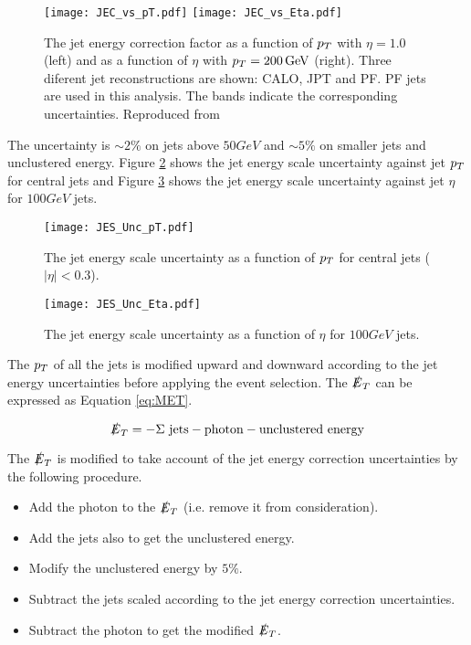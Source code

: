 \begin{figure}
\texttt{[image: JEC\_vs\_pT.pdf]}
\texttt{[image: JEC\_vs\_Eta.pdf]}
\caption{The jet energy correction factor as a function of $p_{T}$ with $\eta =
1.0$ (left) and as a function of $\eta$ with $p_{T} = 200 \, \mathrm{GeV}$ (right). 
Three diferent jet reconstructions are shown: CALO, JPT and PF. PF jets are used 
in this analysis. The bands indicate the corresponding uncertainties. Reproduced
from \cite{jec}}
\label{fig:JEC_vs_pT_And_Eta}
\end{figure}

The uncertainty is $\sim 2 \unit{\%}$ on jets above $50 \unit{GeV}$ and $\sim 5 
\unit{\%}$ on smaller jets and unclustered energy. Figure \ref{fig:JES_Unc_pT} 
shows the jet energy scale uncertainty against jet $p_{T}$ for central jets and 
Figure \ref{fig:JES_Unc_Eta} shows the jet energy scale uncertainty against jet
$\eta$ for $100\unit{GeV}$ jets. \\

\begin{figure}
\begin{center}
\texttt{[image: JES\_Unc\_pT.pdf]}
\end{center}
\caption{The jet energy scale uncertainty as a function of $p_{T}$ for
central jets ($|\eta| < 0.3$).}
\label{fig:JES_Unc_pT}
\end{figure}

\begin{figure}
\begin{center}
\texttt{[image: JES\_Unc\_Eta.pdf]}
\end{center}
\caption{The jet energy scale uncertainty as a function of $\eta$ for
$100\unit{GeV}$ jets.}
\label{fig:JES_Unc_Eta}
\end{figure}

The $p_{T}$ of all the jets is modified upward and downward according to the jet 
energy uncertainties before applying the event selection. The $\slashed{E}_{T}$ can be 
expressed as Equation \ref{eq:MET}.

\begin{equation}
\slashed{E}_{T} = -\Sigma \mbox{ jets} - \mbox{photon} - \mbox{unclustered energy}
\label{eq:MET}
\end{equation}

The $\slashed{E}_{T}$ is modified to take account of the jet energy correction
uncertainties by the following procedure. 

\begin{itemize}
\item Add the photon to the $\slashed{E}_{T}$ (i.e. remove it from consideration).
\item Add the jets also to get the unclustered energy.
\item Modify the unclustered energy by $5\unit{\%}$.
\item Subtract the jets scaled according to the jet energy correction 
uncertainties.
\item Subtract the photon to get the modified $\slashed{E}_{T}$.
\end{itemize}

